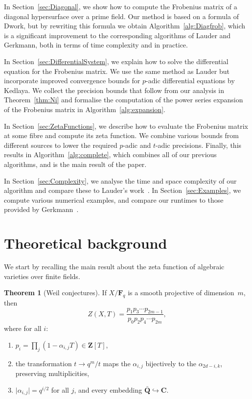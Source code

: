 \documentclass[a4paper,11pt]{article}
\numberwithin{equation}{section}
\providecommand{\abs}[1]{\lvert#1\rvert}                 %
\newcommand{\ZZ}{\mathbf{Z}} %
\newcommand{\QQ}{\mathbf{Q}} %
\newcommand{\CC}{\mathbf{C}} %
\newcommand{\FF}{\mathbf{F}} %
\theoremstyle{definition}
\newtheorem{thm}{Theorem}[section]
\begin{document}
In Section~\ref{sec:Diagonal}, we show how to compute the Frobenius matrix of
a diagonal hypersurface over a prime field. Our method is based on a formula 
of Dwork, but by rewriting this formula we obtain Algorithm~\ref{alg:Diagfrob}, 
which is a significant improvement to the corresponding algorithms of Lauder 
and Gerkmann, both in terms of time complexity and in practice.

In Section~\ref{sec:DifferentialSystem}, we explain how to solve the 
differential equation for the Frobenius matrix. We use the same method as 
Lauder but incorporate improved convergence bounds for $p$-adic differential 
equations by Kedlaya. We collect the precision bounds that follow from our 
analysis in Theorem~\ref{thm:Ni} and formalise the computation of the power 
series expansion of the Frobenius matrix in Algorithm~\ref{alg:expansion}.

In Section~\ref{sec:ZetaFunctions}, we describe how to evaluate the Frobenius 
matrix at some fibre and compute its zeta function. We combine various bounds 
from different sources to lower the required $p$-adic and $t$-adic precisions. 
Finally, this results in Algorithm~\ref{alg:complete}, which combines all of 
our previous algorithms, and is the main result of the paper.

In Section~\ref{sec:Complexity}, we analyse the time and space complexity of 
our algorithm and compare these to Lauder's work~\citep{Lauder2004a}. 
In Section~\ref{sec:Examples}, we compute various numerical examples, and 
compare our runtimes to those provided by Gerkmann~\citep{Gerkmann2007}. 

\section{Theoretical background}
\label{sec:Background}

We start by recalling the main result about the zeta function of algebraic
varieties over finite fields.

\begin{thm}[Weil conjectures] If $X/\FF_q$ is a smooth projective of 
dimension~$m$, then \label{thm:weildeligne}
\[
Z(X,T)=\frac{p_1 p_3 \dotsm p_{2m-1}}{p_0 p_2 p_4 \dotsm p_{2m}},
\]
where for all $i$:
\begin{enumerate}
\item $p_i = \prod_j (1-\alpha_{i,j}T) \in \ZZ[T]$, 
\item the transformation $t \rightarrow q^m/t$ maps the $\alpha_{i,j}$ 
      bijectively to the $\alpha_{2d-i,k}$, preserving multiplicities,
\item $\abs{\alpha_{i,j}} = q^{i/2}$ for all $j$, and every embedding 
      $\bar{\QQ} \hookrightarrow \CC$. 
\end{enumerate}
\end{thm}
\end{document}
